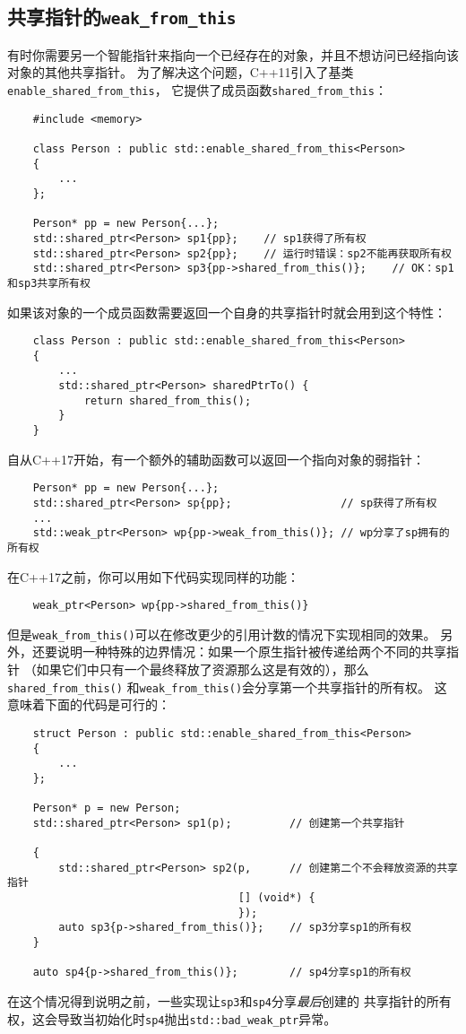\subsection{共享指针的\texttt{weak\_from\_this}}
有时你需要另一个智能指针来指向一个已经存在的对象，并且不想访问已经指向该对象的其他共享指针。
为了解决这个问题，C++11引入了基类\texttt{enable\_shared\_from\_this}，
它提供了成员函数\texttt{shared\_from\_this}：
\begin{lstlisting}
    #include <memory>

    class Person : public std::enable_shared_from_this<Person>
    {
        ...
    };

    Person* pp = new Person{...};
    std::shared_ptr<Person> sp1{pp};    // sp1获得了所有权
    std::shared_ptr<Person> sp2{pp};    // 运行时错误：sp2不能再获取所有权
    std::shared_ptr<Person> sp3{pp->shared_from_this()};    // OK：sp1和sp3共享所有权
\end{lstlisting}
如果该对象的一个成员函数需要返回一个自身的共享指针时就会用到这个特性：
\begin{lstlisting}
    class Person : public std::enable_shared_from_this<Person>
    {
        ...
        std::shared_ptr<Person> sharedPtrTo() {
            return shared_from_this();
        }
    }
\end{lstlisting}
自从C++17开始，有一个额外的辅助函数可以返回一个指向对象的弱指针：
\begin{lstlisting}
    Person* pp = new Person{...};
    std::shared_ptr<Person> sp{pp};                 // sp获得了所有权
    ...
    std::weak_ptr<Person> wp{pp->weak_from_this()}; // wp分享了sp拥有的所有权
\end{lstlisting}
在C++17之前，你可以用如下代码实现同样的功能：
\begin{lstlisting}
    weak_ptr<Person> wp{pp->shared_from_this()}
\end{lstlisting}
但是\texttt{weak\_from\_this()}可以在修改更少的引用计数的情况下实现相同的效果。
另外，还要说明一种特殊的边界情况：如果一个原生指针被传递给两个不同的共享指针
（如果它们中只有一个最终释放了资源那么这是有效的），那么\texttt{shared\_from\_this()}
和\texttt{weak\_from\_this()}会分享第一个共享指针的所有权。
这意味着下面的代码是可行的：
\begin{lstlisting}
    struct Person : public std::enable_shared_from_this<Person>
    {
        ...
    };

    Person* p = new Person;
    std::shared_ptr<Person> sp1(p);         // 创建第一个共享指针

    {
        std::shared_ptr<Person> sp2(p,      // 创建第二个不会释放资源的共享指针
                                    [] (void*) {
                                    });
        auto sp3{p->shared_from_this()};    // sp3分享sp1的所有权
    }

    auto sp4{p->shared_from_this()};        // sp4分享sp1的所有权
\end{lstlisting}
在这个情况得到说明之前，一些实现让\texttt{sp3}和\texttt{sp4}分享\emph{最后}创建的
共享指针的所有权，这会导致当初始化时\texttt{sp4}抛出\texttt{std::bad\_weak\_ptr}异常。


